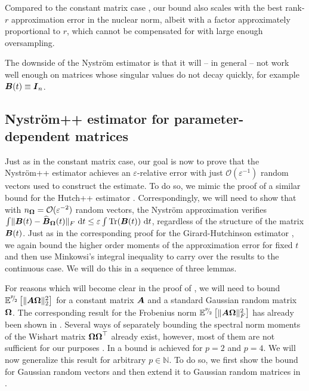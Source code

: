 \documentclass[12pt]{article}
\begin{document}
Compared to the constant matrix case \cite[theorem 8.1]{tropp-2023-randomized-algorithms}, our bound also scales with the best rank-$r$ approximation error in the nuclear norm, albeit with a factor approximately proportional to $r$, which cannot be compensated for with large enough oversampling.

The downside of the Nyström estimator is that it will -- in general -- not work well enough on matrices whose singular values do not decay quickly, for example $\boldsymbol{B}(t) \equiv \boldsymbol{I}_n$.

\subsection{Nyström++ estimator for parameter-dependent matrices}
\label{subsec:nystrom-pp}

Just as in the constant matrix case, our goal is now to prove that the Nyström++ estimator  achieves an $\varepsilon$-relative error with just $\mathcal{O}(\varepsilon^{-1})$ random vectors used to construct the estimate. To do so, we mimic the proof of a similar bound for the Hutch++ estimator \cite[theorem 3.1]{meyer-2021-hutch-optimal}. Correspondingly, we will need to show that with $n_{\boldsymbol{\Omega}} = \mathcal{O}(\varepsilon^{-2})$ random vectors, the Nyström approximation verifies $\int \lVert \boldsymbol{B}(t) - \widehat{\boldsymbol{B}}_{\boldsymbol{\Omega}}(t)\rVert _F~\mathrm{d}t \leq \varepsilon \int \operatorname{Tr}(\boldsymbol{B}(t))~\mathrm{d}t$, regardless of the structure of the matrix $\boldsymbol{B}(t)$. Just as in the corresponding proof for the Girard-Hutchinson estimator , we again bound the higher order moments of the approximation error for fixed $t$ and then use Minkowsi's integral inequality to carry over the results to the continuous case. We will do this in a sequence of three lemmas.

For reasons which will become clear in the proof of , we will need to bound $\mathbb{E}^{{}^{p}{\mskip -5mu/\mskip -3mu}_{2}}\left[\lVert \boldsymbol{A} \boldsymbol{\Omega} \rVert _2^2 \right]$ for a constant matrix $\boldsymbol{A}$ and a standard Gaussian random matrix $\boldsymbol{\Omega}$. The corresponding result for the Frobenius norm $\mathbb{E}^{{}^{p}{\mskip -5mu/\mskip -3mu}_{2}}\left[\lVert \boldsymbol{A} \boldsymbol{\Omega} \rVert _F^2 \right]$ has already been shown in \cite{kressner-2023-randomized-lowrank}. Several ways of separately bounding the spectral norm moments of the Wishart matrix $\boldsymbol{\Omega} \boldsymbol{\Omega}^{\top}$ already exist, however, most of them are not sufficient for our purposes \cite{chen-2005-condition-numbers, edelman-1988-eigenvalues-condition, james-1964-distributions-matrix}. In \cite[lemma B.1]{tropp-2023-randomized-algorithms} a bound is achieved for $p = 2$ and $p = 4$. We will now generalize this result for arbitrary $p \in \mathbb{N}$. To do so, we first show the bound for Gaussian random vectors and then extend it to Gaussian random matrices in .
\end{document}
